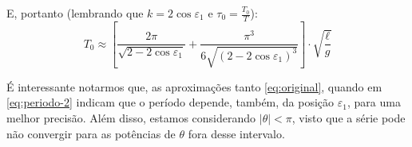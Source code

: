 \begin{solution}
E, portanto (lembrando que $ k = 2\cos\varepsilon_1 $ e $\tau_0 = \frac{T_0}{T}$):
	 \begin{equation}
		 T_0 \approx \left[\frac{2\pi}{\sqrt{2-2\cos\varepsilon_1}} + \frac{\pi^3}{6\sqrt{(2-2\cos\varepsilon_1)^3}}\right]\cdot \sqrt{\frac{\ell}{g}}
		\label{eq:periodo-2}
	 \end{equation}
		
 É interessante notarmos que, as aproximações tanto \eqref{eq:original}, quando
	em \eqref{eq:periodo-2} indicam que o período	depende, também, da	posição 
	$\varepsilon_1$, para uma melhor precisão.
	Além disso, estamos considerando $\vert\theta\vert < \pi$, visto que a série
	pode não convergir para as potências de $\theta$ fora desse intervalo.
\end{solution}




















